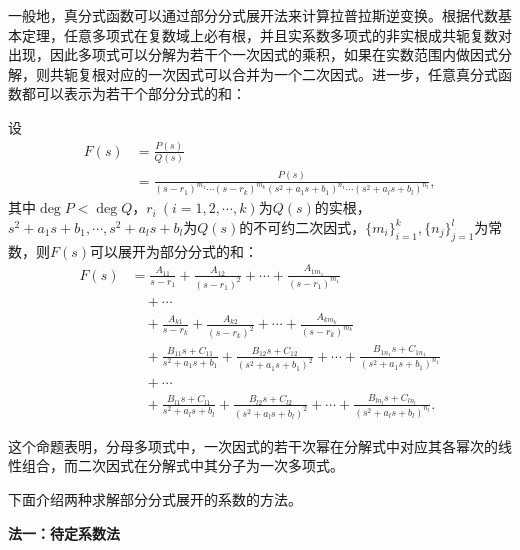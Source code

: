 一般地，真分式函数可以通过部分分式展开法来计算拉普拉斯逆变换。根据代数基本定理，任意多项式在复数域上必有根，并且实系数多项式的非实根成共轭复数对出现，因此多项式可以分解为若干个一次因式的乘积，如果在实数范围内做因式分解，则共轭复根对应的一次因式可以合并为一个二次因式。进一步，任意真分式函数都可以表示为若干个部分分式的和\cite{zorich}\cite{xinjiang}：
\begin{theorem}[部分分式展开定理]
    设
    \begin{align}
        F(s)&=\frac{P(s)}{Q(s)}\nonumber\\
        &=\frac{P(s)}{(s-r_1)^{m_1}\cdots (s-r_k)^{m_k}(s^2+a_1 s+b_1)^{n_1}\cdots (s^2+a_l s+b_l)^{n_l}},
    \end{align}
    其中$\deg P<\deg Q$，$r_i\ (i=1,2,\cdots,k)$为$Q(s)$的实根，$s^2+a_1 s+b_1,\cdots,s^2+a_l s+b_l$为$Q(s)$的不可约二次因式，$\{m_i\}_{i=1}^k,\{n_j\}_{j=1}^l$为常数，则$F(s)$可以展开为部分分式的和：
    \begin{align}
        F(s)&=\frac{A_{11}}{s-r_1}+\frac{A_{12}}{(s-r_1)^2}+\cdots +\frac{A_{1m_1}}{(s-r_1)^{m_1}}\nonumber\\
        &\quad+\cdots\nonumber\\
        &\quad+\frac{A_{k1}}{s-r_k}+\frac{A_{k2}}{(s-r_k)^2}+\cdots +\frac{A_{km_k}}{(s-r_k)^{m_k}}\nonumber\\
        &\quad+\frac{B_{11}s+C_{11}}{s^2+a_1 s+b_1}+\frac{B_{12}s+C_{12}}{(s^2+a_1 s+b_1)^2}+\cdots +\frac{B_{1n_1}s+C_{1n_1}}{(s^2+a_1 s+b_1)^{n_1}}\nonumber\\
        &\quad+\cdots\nonumber\\
        &\quad+\frac{B_{l1}s+C_{l1}}{s^2+a_l s+b_l}+\frac{B_{l2}s+C_{l2}}{(s^2+a_l s+b_l)^2}+\cdots +\frac{B_{ln_l}s+C_{ln_l}}{(s^2+a_l s+b_l)^{n_l}}.
    \end{align}
\end{theorem}
这个命题表明，分母多项式中，一次因式的若干次幂在分解式中对应其各幂次的线性组合，而二次因式在分解式中其分子为一次多项式。

下面介绍两种求解部分分式展开的系数的方法。

\noindent \textbf{法一：待定系数法}

